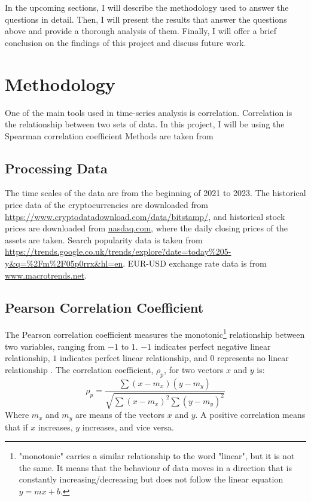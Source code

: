 \documentclass[a4paper, 10pt, conference]{ieeeconf}      %
\begin{document}
In the upcoming sections, I will describe the methodology used to answer the questions in detail. Then, I will present the results that answer the questions above and provide a thorough analysis of them. Finally, I will offer a brief conclusion on the findings of this project and discuss future work.

\section{Methodology}
One of the main tools used in time-series analysis is correlation. Correlation is the relationship between two sets of data. In this project, I will be using the Spearman correlation coefficient  Methods are taken from \cite{Pal2017}
\subsection{Processing Data}
The time scales of the data are from the beginning of 2021 to 2023. The historical price data of the cryptocurrencies are downloaded from \url{https://www.cryptodatadownload.com/data/bitstamp/}, and historical stock prices are downloaded from \url{nasdaq.com}, where the daily closing prices of the assets are taken. Search popularity data is taken from \url{https://trends.google.co.uk/trends/explore?date=today\%205-y&q=\%2Fm\%2F05p0rrx&hl=en}. EUR-USD exchange rate data is from \url{www.macrotrends.net}.

\subsection{Pearson Correlation Coefficient}\label{Pearson}
The Pearson correlation coefficient measures the monotonic\footnote{"monotonic" carries a similar relationship to the word "linear", but it is not the same. It means that the behaviour of data moves in a direction that is constantly increasing/decreasing but does not follow the linear equation $y = mx + b$.} relationship between two variables, ranging from $-1$ to $1$. $-1$ indicates perfect negative linear relationship, $1$ indicates perfect linear relationship, and $0$ represents no  linear relationship \cite{Dowdy1983}. The correlation coefficient, $\rho_{p}$, for two vectors $x$ and $y$ is:
\begin{equation}
    \rho_{p} = \frac{\sum(x-m_x)(y-m_y)}{\sqrt{\sum(x-m_x)^2\sum(y-m_y)^2}}
\end{equation}
Where $m_x$ and $m_y$ are means of the vectors $x$ and $y$. A positive correlation means that if $x$ increases, $y$ increases, and vice versa.
\end{document}
